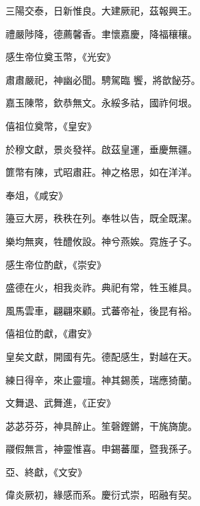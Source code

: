\begin{pinyinscope}
 三陽交泰，日新惟良。大建厥祀，茲報興王。



 禮嚴陟降，德薦馨香。聿懷嘉慶，降福穰穰。



 感生帝位奠玉幣，《光安》



 肅肅嚴祀，神幽必聞。騁駕臨
 饗，將歆飶芬。



 嘉玉陳幣，欽恭無文。永綏多祜，國祚何垠。



 僖祖位奠幣，《皇安》



 於穆文獻，景炎發祥。啟茲皇運，垂慶無疆。



 篚幣有陳，式昭肅莊。神之格思，如在洋洋。



 奉俎，《咸安》



 籩豆大房，秩秩在列。奉牲以告，既全既潔。



 樂均無爽，牲醴攸設。神兮燕娭。霓旌孑孓。



 感生帝位酌獻，《崇安》



 盛德在火，相我炎祚。典祀有常，牲玉維具。



 風馬雲車，翩翩來顧。式蕃帝祉，後昆有裕。



 僖祖位酌獻，《肅安》



 皇矣文獻，開國有先。德配感生，對越在天。



 練日得辛，來止靈壇。神其錫羨，瑞應猗蘭。



 文舞退、武舞進，《正安》



 苾苾芬芬，神具醉止。笙磬鏗鏘，干旄旖旎。



 鬷假無言，神靈惟喜。申錫蕃厘，暨我孫子。



 亞、終獻，《文安》



 偉炎厥初，緣感而系。慶衍式崇，昭融有契。




\end{pinyinscope}
